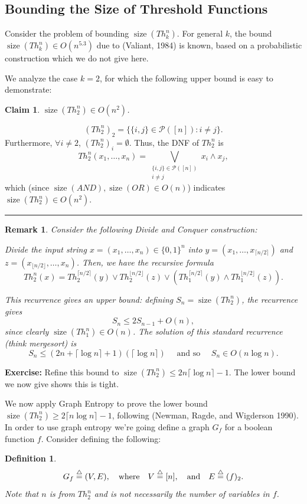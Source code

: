 \documentclass[twoside]{article}
\newcounter{tnum}
\newtheorem{claim}[tnum]{Claim}
\newtheorem{definition}[tnum]{Definition}
\newtheorem{remark}[tnum]{Remark}
\newenvironment{proof}{{\bf Proof:}}{\hfill\rule{2mm}{2mm}}
\newcommand\pow[1]{\mathcal{P} \left( #1 \right)}
\newcommand\size{\operatorname{size}}
\begin{document}
\subsection{Bounding the Size of Threshold Functions}
Consider the problem of bounding $\size(Th_k^n)$. For general $k$, the bound
$\size(Th_k^n) \in O(n^{5.3})$ due to (Valiant, 1984) is known, based on a
probabilistic construction which we do not give here.

We analyze the case $k = 2$, for which the following upper bound is easy to
demonstrate:
\begin{claim}
$\size(Th_2^n) \in O(n^2)$.
\end{claim}
\begin{proof}
\[(Th_2^n)_2 = \{\{i,j\} \in \pow{[n]} : i \neq j\}.\]
Furthermore, $\forall i \neq 2$, $(Th_2^n)_i = \emptyset$. Thus, the DNF of
$Th_2^n$ is
\[Th_2^n(x_1,\dots,x_n)
    = \bigvee_{\substack{\{i,j\} \in \pow{[n]} \\ i \neq j}} x_i \wedge x_j,
\]
which (since $\size(AND), \size(OR) \in O(n)$) indicates
$\size(Th_2^n) \in O(n^2)$.
\end{proof}

\begin{remark}
Consider the following Divide and Conquer construction:

Divide the input string $x = (x_1,\dots,x_n) \in \{0,1\}^n$ into
$y = (x_1,\dots,x_{\lceil n/2 \rceil})$ and
$z = (x_{\lfloor n/2 \rfloor},\dots,x_n)$.
Then, we have the recursive formula
\[Th_2^n(x)
    = Th_2^{\lceil n/2 \rceil}(y)
    \vee Th_2^{\lfloor n/2 \rfloor}(z)
    \vee (Th_1^{\lceil n/2 \rceil}(y) \wedge Th_1^{\lfloor n/2 \rfloor}(z)).
\]

This recurrence gives an upper bound: defining $S_n = \size(Th_2^n)$, the
recurrence gives
\[S_n \leq 2S_{n - 1} + O(n),\]
since clearly $\size(Th_1^n) \in O(n)$. The solution of this standard
recurrence (think mergesort) is
\[S_n \leq (2n + \lceil \log n \rceil + 1)(\lceil \log n \rceil)
    \quad \mbox{ and so } \quad
    S_n \in O(n \log n).
\]
\end{remark}

{\bf Exercise:} Refine this bound to
$\size(Th_2^n) \leq 2n \lceil \log n \rceil - 1$. The lower bound we now give
shows this is tight.

We now apply Graph Entropy to prove the lower bound
$\size(Th_2^n) \geq 2 \lceil n \log n \rceil - 1$, following
(Newman, Ragde, and Wigderson 1990).
In order to use graph entropy we're going define a
graph $G_f$ for a boolean function $f$. Consider defining the following:
\begin{definition}
\[G_f \buildrel\triangle\over = (V,E),
    \quad \mbox{where} \quad V \buildrel\triangle\over = [n],
    \quad \mbox{and} \quad
    E \buildrel\triangle\over = (f)_2.
\]
Note that $n$ is from $Th_2^n$ and is not necessarily the number of variables
in $f$.
\end{definition}
\end{document}
